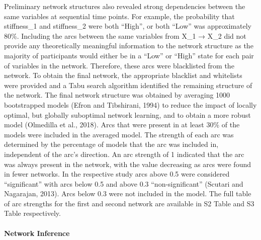 \documentclass[
  english,
  man,floatsintext]{apa6}
\let\oldparagraph\paragraph
\renewcommand{\paragraph}[1]{\oldparagraph{#1}\mbox{}}
\begin{document}
Preliminary network structures also revealed strong dependencies between the same variables at sequential time points. For example, the probability that stiffness\_1 and stiffness\_2 were both ``High'', or both ``Low'' was approximately 80\%. Including the arcs between the same variables from X\_1 → X\_2 did not provide any theoretically meaningful information to the network structure as the majority of participants would either be in a ``Low'' or ``High'' state for each pair of variables in the network. Therefore, these arcs were blacklisted from the network.
To obtain the final network, the appropriate blacklist and whitelists were provided and a Tabu search algorithm identified the remaining structure of the network.
The final network structure was obtained by averaging 1000 bootstrapped models (Efron and Tibshirani, 1994) to reduce the impact of locally optimal, but globally suboptimal network learning, and to obtain a more robust model (Olmedilla et al., 2018). Arcs that were present in at least 30\% of the models were included in the averaged model.
The strength of each arc was determined by the percentage of models that the arc was included in, independent of the arc's direction. An arc strength of 1 indicated that the arc was always present in the network, with the value decreasing as arcs were found in fewer networks. In the respective study arcs above 0.5 were considered ``significant'' with arcs below 0.5 and above 0.3 ``non-significant'' (Scutari and Nagarajan, 2013).
Arcs below 0.3 were not included in the model. The full table of arc strengths for the first and second network are available in S2 Table and S3 Table respectively.

\hypertarget{network-inference}{%
\paragraph{Network Inference}\label{network-inference}}
\end{document}
